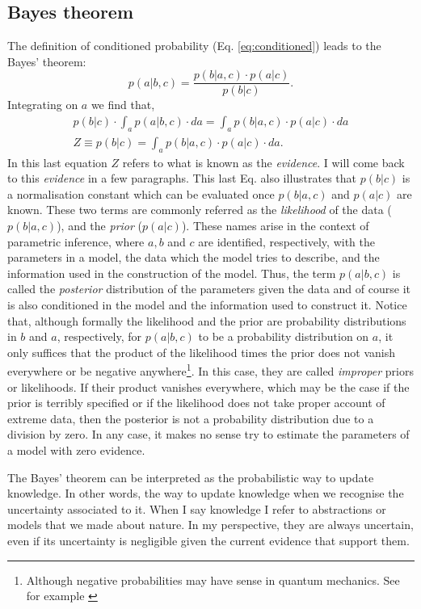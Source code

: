 \subsection{Bayes theorem}
The definition of conditioned probability (Eq. \ref{eq:conditioned}) leads to the Bayes' theorem:
\begin{equation}
p(a|b,c) = \frac{p(b|a,c)\cdot p(a|c)}{p(b|c)}.
\end{equation}
Integrating on $a$ we find that,
\begin{align}
p(b|c) \cdot \int_a p(a|b,c)\cdot da = \int_a p(b|a,c) \cdot p(a|c) \cdot da \nonumber \\
Z \equiv p(b|c) = \int_a p(b|a,c) \cdot p(a|c) \cdot da.
\end{align}
In this last equation $Z$ refers to what is known as the \emph{evidence}. I will come back to this \emph{evidence} in a few paragraphs. This last Eq. also illustrates that $p(b|c)$ is a normalisation constant which can be evaluated once $p(b|a,c)$ and $p(a|c)$ are known. These two terms are commonly referred as the \emph{likelihood} of the data ($p(b|a,c)$), and the \emph{prior} ($p(a|c)$). These names arise in the context of parametric inference, where $a,b$ and $c$ are identified, respectively, with the parameters in a model, the data which the model tries to describe, and the information used in the construction of the model. Thus, the term $p(a|b,c)$ is called the \emph{posterior} distribution of the parameters given the data and of course it is also conditioned in the model and the information used to construct it. Notice that, although formally the likelihood and the prior are probability distributions in $b$ and $a$, respectively, for $p(a|b,c)$ to be a probability distribution on $a$, it only suffices that the product of the likelihood times the prior does not vanish everywhere or be negative anywhere\footnote{Although negative probabilities may have sense in quantum mechanics. See for example \citep{1942RSPSA.180....1D}}. In this case, they are called \emph{improper} priors or likelihoods. If their product vanishes everywhere, which may be the case if the prior is terribly specified or if the likelihood does not take proper account of extreme data, then the posterior is not a probability distribution due to a division by zero. In any case, it makes no sense try to estimate the parameters of a model with zero evidence.

The Bayes' theorem can be interpreted as the probabilistic way to update knowledge. In other words, the way to update knowledge when we recognise the uncertainty associated to it. When I say knowledge I refer to abstractions or models that we made about nature. In my perspective, they are always uncertain, even if its uncertainty is negligible given the current evidence that support them.

